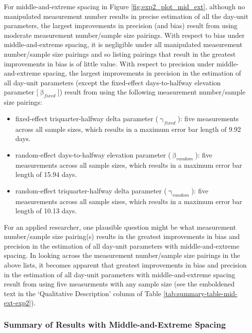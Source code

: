 \documentclass[
12pt, %
twoside,
english]{guelphthesis}
\begin{document}
For middle-and-extreme spacing in Figure \ref{fig:exp2_plot_mid_ext}, although no manipulated measurement number results in precise estimation of all the day-unit parameters, the largest improvements in precision (and bias) result from using moderate measurement number/sample size pairings. With respect to bias under middle-and-extreme spacing, it is negligible under all manipulated measurement number/sample size pairings and so listing pairings that result in the greatest improvements in bias is of little value. With respect to precision under middle-and-extreme spacing, the largest improvements in precision in the estimation of all day-unit parameters (except the fixed-effect days-to-halfway elevation parameter {[}\(\upbeta_{fixed}\){]}) result from using the following measurement number/sample size pairings:
\begin{itemize}
\tightlist
\item
  fixed-effect triquarter-halfway delta parameter (\(\upgamma_{fixed}\)): five measurements across all sample sizes, which results in a maximum error bar length of 9.92 days.
\item
  random-effect days-to-halfway elevation parameter (\(\upbeta_{random}\)): five measurements across all sample sizes, which results in a maximum error bar length of 15.94 days.
\item
  random-effect triquarter-halfway delta parameter (\(\upgamma_{random}\)): five measurements across all sample sizes, which results in a maximum error bar length of 10.13 days.
\end{itemize}
For an applied researcher, one plausible question might be what measurement number/sample size pairing(s) results in the greatest improvements in bias and precision in the estimation of all day-unit parameters with middle-and-extreme spacing. In looking across the measurement number/sample size pairings in the above lists, it becomes apparent that greatest improvements in bias and precision in the estimation of all day-unit parameters with middle-and-extreme spacing result from using five measurments with any sample size (see the emboldened text in the `Qualitative Description' column of Table \ref{tab:summary-table-mid-ext-exp2}).

\hypertarget{summary-of-results-with-middle-and-extreme-spacing-1}{%
\subsubsection{Summary of Results with Middle-and-Extreme Spacing}\label{summary-of-results-with-middle-and-extreme-spacing-1}}
\end{document}
